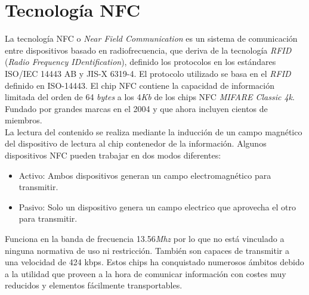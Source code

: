 \documentclass[../PFC.tex]{subfiles}
\begin{document}
\section{Tecnología NFC}
\label{Tecnología NFC}

La tecnología NFC o \textit{Near Field Communication} es un sistema de comunicación entre dispositivos basado en radiofrecuencia, que deriva de la tecnología \textit{RFID} (\textit{Radio Frequency IDentification}), definido los protocolos en los estándares ISO/IEC 14443 AB y JIS-X 6319-4\cite{nfcSpecifications}. El protocolo utilizado se basa en el \textit{RFID} definido en ISO-14443\cite{iso14443}. El chip NFC contiene la capacidad de información limitada del orden de 64 \textit{bytes} a los 4\textit{Kb} de los chips NFC \textit{MIFARE Classic 4k}. Fundado por grandes marcas en el 2004 y que ahora incluyen cientos de miembros.
\*
\vspace{0.5515cm}
\\
La lectura del contenido se realiza mediante la inducción de un campo magnético del dispositivo de lectura al chip contenedor de la información. Algunos dispositivos NFC pueden trabajar en dos modos diferentes:

\begin{itemize}
\item{Activo: Ambos dispositivos generan un campo electromagnético para transmitir.}
\item{Pasivo: Solo un dispositivo genera un campo electrico que aprovecha el otro para transmitir.}
\end{itemize}

Funciona en la banda de frecuencia 13.56\textit{Mhz} por lo que no está vinculado a ninguna normativa de uso ni restricción. También son capaces de transmitir a una velocidad de 424 kbps\cite{nfcSpecifications}. Estos chips ha conquistado numerosos ámbitos debido a la utilidad que proveen a la hora de comunicar información con costes muy reducidos y elementos fácilmente transportables.
\end{document}
